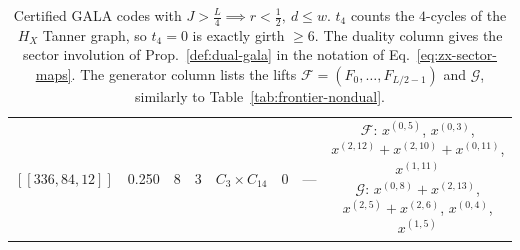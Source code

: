 \begin{table}[t]
\begin{tabular}{llcccccc}
$[[336, 84, 12]]$ & 0.250 & 8 & 3 & $C_{3}\!\times\!C_{14}$ & 0 & --- & \parbox[t]{0.46\textwidth}{\raggedright $\mathcal{F}$: $x^{(0,5)}$, $x^{(0,3)}$, $x^{(2,12)}{+}x^{(2,10)}{+}x^{(0,11)}$, $x^{(1,11)}$ \\ $\mathcal{G}$: $x^{(0,8)}{+}x^{(2,13)}$, $x^{(2,5)}{+}x^{(2,6)}$, $x^{(0,4)}$, $x^{(1,5)}$} \\
\bottomrule
\end{tabular}
\caption{Certified GALA codes with $J> \frac L4\implies r< \frac12,\ d\leq w$. $t_4$ counts the $4$-cycles of the $H_X$ Tanner graph, so $t_4=0$ is exactly girth $\geq6$. The duality column gives the sector involution of Prop.~\ref{def:dual-gala} in the notation of Eq.~\eqref{eq:zx-sector-maps}. The generator column lists the lifts $\mathcal F=(F_0,\dots,F_{L/2-1})$ and $\mathcal G$, similarly to Table~\ref{tab:frontier-nondual}.}
\label{tab:frontier-other}
\end{table}